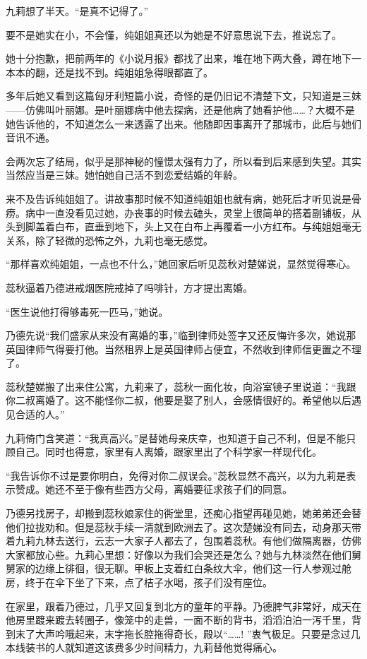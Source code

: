 \par 九莉想了半天。“是真不记得了。”
\par 要不是她实在小，不会懂，纯姐姐真还以为她是不好意思说下去，推说忘了。
\par 她十分抱歉，把前两年的《小说月报》都找了出来，堆在地下两大叠，蹲在地下一本本的翻，还是找不到。纯姐姐急得眼都直了。
\par 多年后她又看到这篇匈牙利短篇小说，奇怪的是仍旧记不清楚下文，只知道是三妹——仿佛叫叶丽娜。是叶丽娜病中他去探病，还是他病了她看护他……？大概不是她告诉他的，不知道怎么一来透露了出来。他随即因事离开了那城市，此后与她们音讯不通。
\par 会两次忘了结局，似乎是那神秘的憧憬太强有力了，所以看到后来感到失望。其实当然应当是三妹。她怕她自己活不到恋爱结婚的年龄。
\par 来不及告诉纯姐姐了。讲故事那时候不知道纯姐姐也就有病，她死后才听见说是骨痨。病中一直没看见过她，办丧事的时候去磕头，灵堂上很简单的搭着副铺板，从头到脚盖着白布，直垂到地下，头上又在白布上再覆着一小方红布。与纯姐姐毫无关系，除了轻微的恐怖之外，九莉也毫无感觉。
\par “那样喜欢纯姐姐，一点也不什么，”她回家后听见蕊秋对楚娣说，显然觉得寒心。
\par 蕊秋逼着乃德进戒烟医院戒掉了吗啡针，方才提出离婚。
\par “医生说他打得够毒死一匹马，”她说。
\par 乃德先说“我们盛家从来没有离婚的事，”临到律师处签字又还反悔许多次，她说那英国律师气得要打他。当然租界上是英国律师占便宜，不然收到律师信更置之不理了。
\par 蕊秋楚娣搬了出来住公寓，九莉来了，蕊秋一面化妆，向浴室镜子里说道：“我跟你二叔离婚了。这不能怪你二叔，他要是娶了别人，会感情很好的。希望他以后遇见合适的人。”
\par 九莉倚门含笑道：“我真高兴。”是替她母亲庆幸，也知道于自己不利，但是不能只顾自己。同时也得意，家里有人离婚，跟家里出了个科学家一样现代化。
\par “我告诉你不过是要你明白，免得对你二叔误会。”蕊秋显然不高兴，以为九莉是表示赞成。她还不至于像有些西方父母，离婚要征求孩子们的同意。
\par 乃德另找房子，却搬到蕊秋娘家住的衖堂里，还痴心指望再碰见她，她弟弟还会替他们拉拢劝和。但是蕊秋手续一清就到欧洲去了。这次楚娣没有同去，动身那天带着九莉九林去送行，云志一大家子人都去了，包围着蕊秋。有他们做隔离器，仿佛大家都放心些。九莉心里想：好像以为我们会哭还是怎么？她与九林淡然在他们舅舅家的边缘上徘徊，很无聊。甲板上支着红白条纹大伞，他们这一行人参观过舱房，终于在伞下坐了下来，点了桔子水喝，孩子们没有座位。
\par 在家里，跟着乃德过，几乎又回复到北方的童年的平静。乃德脾气非常好，成天在他房里踱来踱去转圈子，像笼中的走兽，一面不断的背书，滔滔泊泊一泻千里，背到末了大声吟哦起来，末字拖长腔拖得奇长，殿以“……! ”衷气极足。只要是念过几本线装书的人就知道这该费多少时间精力，九莉替他觉得痛心。
